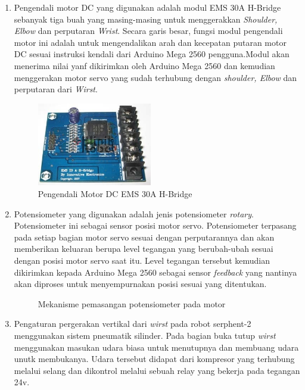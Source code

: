 	\begin{enumerate}
		\item Pengendali motor DC yang digunakan adalah modul EMS 30A H-Bridge sebanyak tiga buah yang masing-masing untuk menggerakkan \textit{Shoulder, Elbow} dan perputaran \textit{Wrist}. Secara garis besar, fungsi modul pengendali motor ini adalah untuk mengendalikan arah dan kecepatan putaran motor DC sesuai instruksi kendali dari Arduino Mega 2560 pengguna.Modul akan menerima nilai yanf dikirimkan oleh Arduino Mega 2560 dan kemudian menggerakan motor servo yang sudah terhubung dengan \textit{shoulder, Elbow} dan perputaran dari \textit{Wirst}.
		
		\begin{figure}[H]
			\centering
			\includegraphics[width=5cm	]{gambar/driver_motor.jpg}
			\caption{Pengendali Motor DC EMS 30A H-Bridge}
		\end{figure}
		
		\item Potensiometer yang digunakan adalah jenis potensiometer \textit{rotary}. Potensiometer ini sebagai sensor posisi motor servo. Potensiometer terpasang pada setiap bagian motor servo sesuai dengan perputarannya dan akan memberikan keluaran berupa level tegangan yang berubah-ubah sesuai dengan posisi motor servo saat itu. Level tegangan tersebut kemudian dikirimkan kepada Arduino Mega 2560 sebagai sensor \textit{feedback} yang nantinya akan diproses untuk menyempurnakan posisi sesuai yang ditentukan.
		\begin{figure}[H]
			\centering
			\caption{Mekanisme pemasangan potensiometer pada motor}
		\end{figure}
		
		\item Pengaturan pergerakan vertikal dari \textit{wirst} pada robot serphent-2 menggunakan sistem pneumatik silinder. Pada bagian buka tutup \textit{wirst} menggunakan masukan udara biasa untuk menutupnya dan membuang udara unutk membukanya. Udara tersebut didapat dari kompresor yang terhubung melalui selang dan dikontrol melalui sebuah relay yang bekerja pada tegangan 24v.
		

\end{enumerate}
